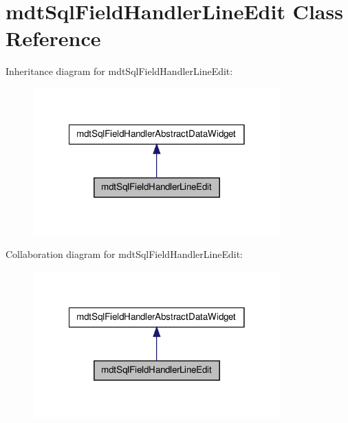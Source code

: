 \hypertarget{classmdt_sql_field_handler_line_edit}{
\section{mdtSqlFieldHandlerLineEdit Class Reference}
\label{classmdt_sql_field_handler_line_edit}
}


Inheritance diagram for mdtSqlFieldHandlerLineEdit:\nopagebreak
\begin{figure}[H]
\begin{center}
\leavevmode
\includegraphics[width=270pt]{classmdt_sql_field_handler_line_edit__inherit__graph}
\end{center}
\end{figure}


Collaboration diagram for mdtSqlFieldHandlerLineEdit:\nopagebreak
\begin{figure}[H]
\begin{center}
\leavevmode
\includegraphics[width=270pt]{classmdt_sql_field_handler_line_edit__coll__graph}
\end{center}
\end{figure}

